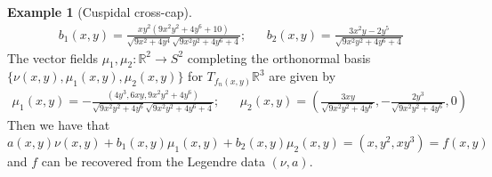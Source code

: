 \documentclass{amsart}
\theoremstyle{definition}
\theoremstyle{definition}
\newtheorem{example}{Example}
\theoremstyle{definition}
\newcommand{\mb}{\mathbb}
\begin{document}
{\begin{example}[Cuspidal cross-cap]
\begin{align*}
	b_1(x,y)=\frac{x y^2 \left(9 x^2 y^2+4 y^6+10\right)}{\sqrt{9 x^2+4 y^4} \sqrt{9 x^2 y^2+4 y^6+4}}; && b_2(x,y)=\frac{3 x^2 y-2 y^5}{\sqrt{9 x^2 y^2+4 y^6+4}}
\end{align*}
The vector fields $\mu_1, \mu_2\colon \mb{R}^2 \to S^2$ completing the orthonormal basis $\{\nu(x,y),\mu_1(x,y),\mu_2(x,y)\}$ for $T_{f_n(x,y)}\mb{R}^3$ are given by
\begin{align*}
	\mu_1(x,y)=-\frac{(4y^3,6 x y, 9 x^2y^2+4y^6)}{\sqrt{9 x^2 y^2+4 y^6} \sqrt{9 x^2 y^2+4 y^6+4}};
		&&
	\mu_2(x,y)=\left(\frac{3 x y}{\sqrt{9 x^2 y^2+4 y^6}},-\frac{2 y^3}{\sqrt{9 x^2 y^2+4 y^6}},0\right)
\end{align*} 
Then we have that
	\[a(x,y)\nu(x,y)+b_1(x,y)\mu_1(x,y)+b_2(x,y)\mu_2(x,y)=(x,y^2,xy^3)=f(x,y)\]
and $f$ can be recovered from the Legendre data $(\nu,a)$.
\end{example}

}
\end{document}
